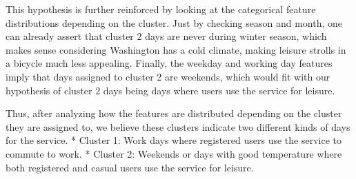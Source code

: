 \documentclass[
]{article}
\newenvironment{Shaded}{\begin{snugshade}}{\end{snugshade}}
\newcommand{\AttributeTok}[1]{\textcolor[rgb]{0.13,0.29,0.53}{#1}}
\newcommand{\CommentTok}[1]{\textcolor[rgb]{0.56,0.35,0.01}{\textit{#1}}}
\newcommand{\DecValTok}[1]{\textcolor[rgb]{0.00,0.00,0.81}{#1}}
\newcommand{\FunctionTok}[1]{\textcolor[rgb]{0.13,0.29,0.53}{\textbf{#1}}}
\newcommand{\NormalTok}[1]{#1}
\newcommand{\OtherTok}[1]{\textcolor[rgb]{0.56,0.35,0.01}{#1}}
\newcommand{\SpecialCharTok}[1]{\textcolor[rgb]{0.81,0.36,0.00}{\textbf{#1}}}
\newcommand{\StringTok}[1]{\textcolor[rgb]{0.31,0.60,0.02}{#1}}
\begin{document}
This hypothesis is further reinforced by looking at the categorical
feature distributions depending on the cluster. Just by checking season
and month, one can already assert that cluster 2 days are never during
winter season, which makes sense considering Washington has a cold
climate, making leisure strolls in a bicycle much less appealing.
Finally, the weekday and working day features imply that days assigned
to cluster 2 are weekends, which would fit with our hypothesis of
cluster 2 days being days where users use the service for leisure.

Thus, after analyzing how the features are distributed depending on the
cluster they are assigned to, we believe these clusters indicate two
different kinds of days for the service. * Cluster 1: Work days where
registered users use the service to commute to work. * Cluster 2:
Weekends or days with good temperature where both registered and casual
users use the service for leisure.

\begin{Shaded}
\end{Shaded}
\end{document}
